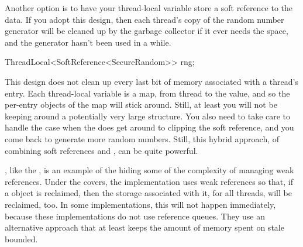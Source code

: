 Another option is to have your thread-local variable store a soft reference to
the data. If you adopt this design, then each thread's copy of the random number
generator will be cleaned up by the garbage collector if it ever needs the
space, and the generator hasn't been used in a while.
\begin{shortlisting}
ThreadLocal<SoftReference<SecureRandom>> rng;
\end{shortlisting}
This design does not clean up every last bit of memory associated with a
thread's entry. Each thread-local variable is a map, from thread to the value,
and so the per-entry objects of the map will stick around. Still, at least you
will not be keeping around a potentially very large structure. You also need to
take care to handle the case when the \jre does get around to clipping the soft
reference, and you come back to generate more random numbers. Still,
this hybrid approach, of combining soft references and \tls, can be quite powerful.

 



\Tls, like the , is an example of the \jre hiding some of the
complexity of managing weak references. Under the covers, the \tls implementation
uses weak references so that, if a  object is reclaimed, then
the storage associated with it, for all threads, will be reclaimed, too. In some
implementations, this will not happen immediately, because these implementations
do not use reference queues. They use an alternative approach that at least
keeps the amount of memory spent on stale \tls bounded.

\begin{comment}
\section{}

\subsection{Avoiding Leaks When Optimizing for Time}
Sometimes a data structure can have multiple lifetime requirements. 
Care is required to make sure that we satisfy all of the requirements.  In this
section we look at two cases where we are balancing the need to save both space and recomputation
time.

\begin{example}{Session State}
\end{example}

\begin{example}{A Caching Sharing Pool}
\end{example}
\end{comment}

